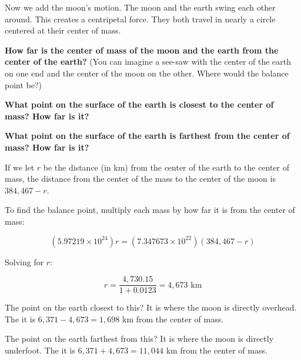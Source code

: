 \begin{Exercise}[title={Life Among the Orbits 4: The Swing of the Moon}, label=life-orbits4]

Now we add the moon's motion.  The moon and the earth swing each other around.  This creates a centripetal force.  They both travel in nearly a circle centered at their center of mass.

\textbf{How far is the center of mass of the moon and the earth from the center of the earth?}  (You can imagine a see-saw with the center of the earth on one end and the center of the moon on the other.   Where would the balance point be?)

\textbf{What point on the surface of the earth is closest to the center of mass?  How far is it?}

\textbf{What point on the surface of the earth is farthest from the center of mass?  How far is it?}


\end{Exercise}

\begin{Answer}[ref=life-orbits4]

If we let $r$ be the distance (in km) from the center of the earth to the center of mass,  the distance from
the center of the mass to the center of the moon is $384,467 - r$.

To find the balance point,  multiply each mass by how far it is from the center of mass:

$$\left( 5.97219 \times 10^{24} \right) r = \left( 7.347673 \times 10^{22} \right) \left(384,467 - r\right)$$

Solving for $r$:

$$ r = \frac{4,730.15}{1 + 0.0123} = 4,673 \text{ km} $$

The point on the earth closest to this?  It is where the moon is directly overhead.  The it is $6,371 - 4,673 = 1,698$ km from the center of mass.

The point on the earth farthest from this?  It is where the moon is directly underfoot.  The it is $6,371 + 4,673 = 11,044$ km from the center of mass.

\end{Answer}

